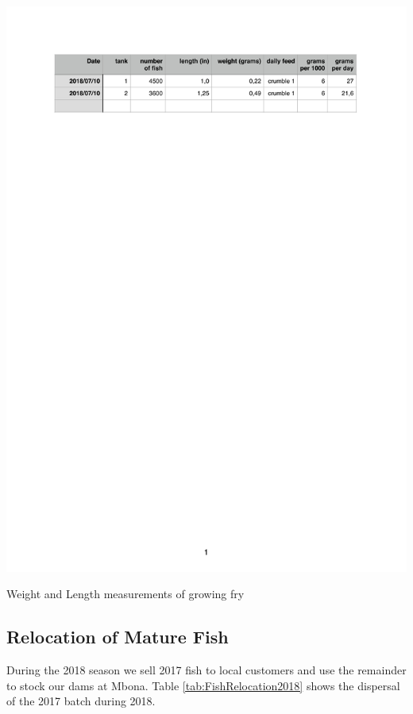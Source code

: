 \begin{table}[H]
  \centering
  \includegraphics[scale = 0.9]{tables/TablesFryGrowth.pdf}
   \caption{Weight and Length measurements of growing fry}
   \label{tab:FryGrowth}
\end{table}

\subsection{Relocation of Mature Fish}

During the 2018 season we sell 2017 fish to local customers and use the remainder
to stock our dams at Mbona. Table \ref{tab:FishRelocation2018} shows the dispersal
of the 2017 batch during 2018.

